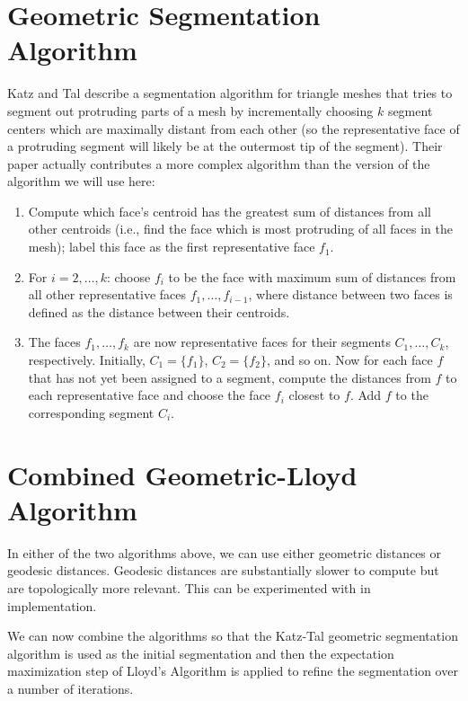 \documentclass{article}
\begin{document}

\section{Geometric Segmentation Algorithm}
Katz and Tal \cite{katztal} describe a segmentation algorithm for triangle
meshes that tries to segment out protruding parts of a mesh by incrementally
choosing $k$ segment centers which are maximally distant from each other (so
the representative face of a protruding segment will likely be at the
outermost tip of the segment).  Their paper actually contributes a more
complex algorithm than the version of the algorithm we will use here:
\begin{enumerate}
\item Compute which face's centroid has the greatest sum of distances from all
other centroids (i.e., find the face which is most protruding of all faces in
the mesh); label this face as the first representative face $f_1$.
\item For $i = 2, \ldots, k$: choose $f_i$ to be the face with maximum sum of
distances from all other representative faces $f_1, \ldots, f_{i-1}$, where
distance between two faces is defined as the distance between their centroids.
\item The faces $f_1, \ldots, f_k$ are now representative faces for their
segments $C_1, \ldots, C_k$, respectively.  Initially, $C_1 = \{f_1\}$,
$C_2 = \{f_2\}$, and so on.  Now for each face $f$ that has not yet been
assigned to a segment, compute the distances from $f$ to each
representative face and choose the face $f_i$ closest to $f$.  Add $f$ to the
corresponding segment $C_i$.
\end{enumerate}


\section{Combined Geometric-Lloyd Algorithm}
In either of the two algorithms above, we can use either geometric distances
or geodesic distances.  Geodesic distances are substantially slower to
compute but are topologically more relevant.  This can be experimented with
in implementation.

We can now combine the algorithms so that the Katz-Tal geometric segmentation
algorithm is used as the initial segmentation and then the expectation
maximization step of Lloyd's Algorithm is applied to refine the segmentation
over a number of iterations.
\end{document}

